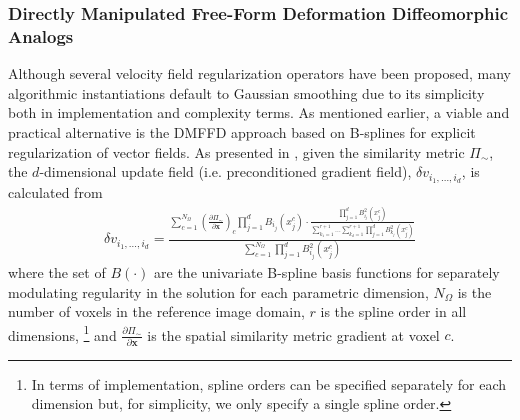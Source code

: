 \documentclass{frontiersSCNS}
\begin{document}
\subsubsection{Directly Manipulated Free-Form Deformation Diffeomorphic Analogs}

Although several velocity field regularization
operators have been proposed, many algorithmic instantiations
default to Gaussian smoothing due to its simplicity both in implementation
and complexity terms.  As mentioned earlier, 
a viable and practical alternative is the DMFFD 
approach based on B-splines for explicit regularization of vector fields.
As presented in \cite{tustison2009}, given the similarity metric
$\Pi_{\sim}$, the $d$-dimensional update field (i.e. preconditioned
gradient field), $\delta v_{i_1,\ldots,i_d}$, is calculated from
\begin{align}
\label{eq:dmffd}
  \delta v_{i_1,\ldots,i_d} = \frac{ \sum_{c=1}^{N_{\Omega}} \left( \frac{\partial \Pi_\sim}{\partial \mathbf{x}} \right)_c \prod_{j=1}^d B_{i_j}(x_j^c)  
  \cdot \frac{\prod_{j=1}^d B_{i_j}^2 (x_j^c)}
  {\sum_{k_1=1}^{r+1}\ldots\sum_{k_d=1}^{r+1} 
  \prod_{j=1}^d B_{k_j}^2 (x_j^c)} }
  {\sum_{c=1}^{N_{\Omega}} \prod_{j=1}^d B_{i_j}^2 (x_j^c)}
\end{align}
where the set of $B(\cdot)$ are the univariate B-spline basis functions for
separately modulating regularity in the solution for each parametric dimension,
$N_\Omega$ is the number of voxels in the reference image domain,
$r$ is the spline order in all dimensions,%
\footnote{
In terms of implementation, spline orders can be specified separately for each dimension but, for simplicity,
we only specify a single spline order.
}
and $\frac{\partial \Pi_\sim}{\partial \mathbf{x}}$ is the spatial 
similarity metric gradient at voxel $c$.
\end{document}
